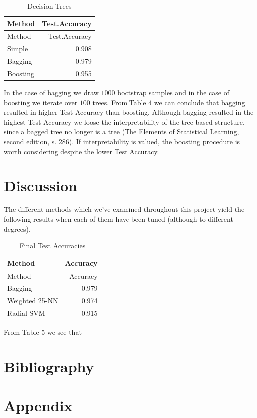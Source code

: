 \documentclass[
]{article}
\begin{document}
\begin{longtable}[]{@{}lr@{}}
\caption{Decision Trees}\tabularnewline
\toprule
Method & Test.Accuracy\tabularnewline
\midrule
\endfirsthead
\toprule
Method & Test.Accuracy\tabularnewline
\midrule
\endhead
Simple & 0.908\tabularnewline
Bagging & 0.979\tabularnewline
Boosting & 0.955\tabularnewline
\bottomrule
\end{longtable}

In the case of bagging we draw \(1000\) bootstrap samples and in the
case of boosting we iterate over \(100\) trees. From Table 4 we can
conclude that bagging resulted in higher Test Accuracy than boosting.
Although bagging resulted in the highest Test Accuracy we loose the
interpretability of the tree based structure, since a bagged tree no
longer is a tree (The Elements of Statistical Learning, second edition,
s. 286). If interpretability is valued, the boosting procedure is worth
considering despite the lower Test Accuracy.

\hypertarget{discussion}{%
\section{Discussion}\label{discussion}}

The different methods which we've examined throughout this project yield
the following results when each of them have been tuned (although to
different degrees).

\begin{longtable}[]{@{}lr@{}}
\caption{Final Test Accuracies}\tabularnewline
\toprule
Method & Accuracy\tabularnewline
\midrule
\endfirsthead
\toprule
Method & Accuracy\tabularnewline
\midrule
\endhead
Bagging & 0.979\tabularnewline
Weighted 25-NN & 0.974\tabularnewline
Radial SVM & 0.915\tabularnewline
\bottomrule
\end{longtable}

From Table 5 we see that

\hypertarget{bibliography}{%
\section{Bibliography}\label{bibliography}}

\hypertarget{appendix}{%
\section{Appendix}\label{appendix}}
\end{document}
